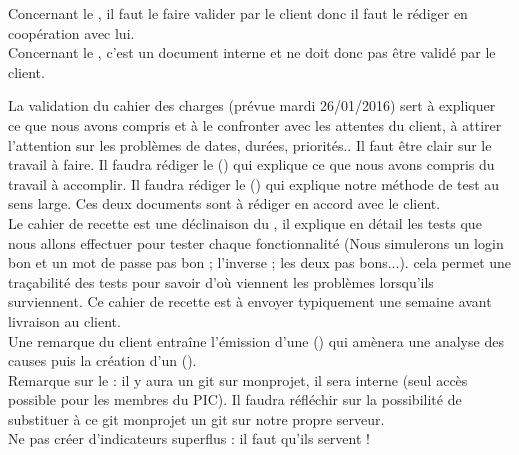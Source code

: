 \documentclass [a4paper] {article}
\begin{document}
Concernant le \PQCourt, il faut le faire valider par le client donc il faut le rédiger en coopération avec lui.
\\
Concernant le \PGCCourt, c'est un document interne et ne doit donc pas être validé par le client.

La validation du cahier des charges (prévue mardi 26/01/2016) sert à expliquer ce que nous avons compris et à le confronter avec les attentes du client, à attirer l'attention sur les problèmes de dates, durées, priorités.. Il faut être clair sur le travail à faire.
Il faudra rédiger le \DSE (\DSECourt) qui explique ce que nous avons compris du travail à accomplir. 
Il faudra rédiger le \PTV (\PTVCourt) qui explique notre méthode de test au sens large.
Ces deux documents sont à rédiger en accord avec le client.
\\
Le cahier de recette est une déclinaison du \PTVCourt, il explique en détail les tests que nous allons effectuer pour tester chaque fonctionnalité (Nous simulerons un login bon et un mot de passe pas bon ; l'inverse ; les deux pas bons...). cela permet une traçabilité des tests pour savoir d'où viennent les problèmes lorsqu'ils surviennent. Ce cahier de recette est à envoyer typiquement une semaine avant livraison au client.
\\
Une remarque du client entraîne l'émission d'une \FFT (\FFTCourt) qui amènera une analyse des causes puis la création d'un \OC (\OCCourt).
\\
Remarque sur le \PGCCourt : il y aura un git sur monprojet, il sera interne (seul accès possible pour les membres du PIC). Il faudra réfléchir sur la possibilité de substituer à ce git monprojet un git sur notre propre serveur.
\\
Ne pas créer d'indicateurs superflus : il faut qu'ils servent !

\newpage
\end{document}

